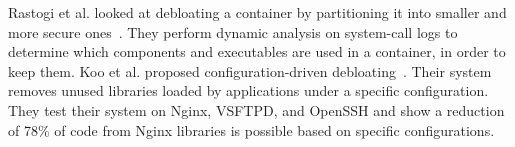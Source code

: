 Rastogi et al. looked at debloating a container by partitioning it into smaller and more secure ones~\cite{rastogi2017Cimplifier}. They perform dynamic analysis on system-call logs to determine which components and executables are used in a container, in order to keep them. Koo et al. proposed configuration-driven debloating~\cite{Koo:2019:CSD:3301417.3312501}. Their system removes unused libraries loaded by applications under a specific configuration. They test their system on Nginx, VSFTPD, and OpenSSH and show a reduction of 78\% of code from Nginx libraries is possible based on specific configurations.
